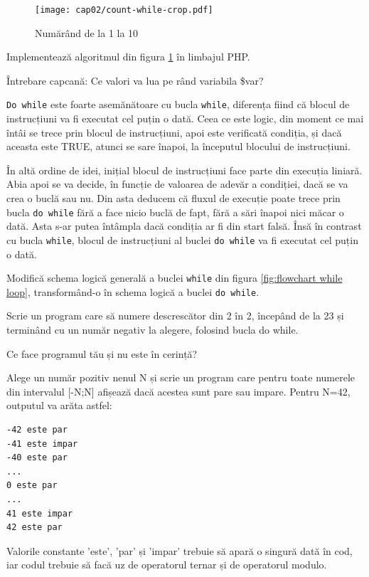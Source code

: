 \begin{figure}[ht!]
  \centering
    \texttt{[image: cap02/count-while-crop.pdf]}
  \caption{Numărând de la 1 la 10}
  \label{fig:while counting}
\end{figure}

\begin{Exercise}[title={Numărătoarea din 1 în 1 cu while},difficulty=1]
\ExePart
Implementează algoritmul din figura \ref{fig:while counting} în limbajul PHP.

\ExePart
Întrebare capcană: Ce valori va lua pe rând variabila \$var?
\end{Exercise}

\texttt{Do while} este foarte asemănătoare cu bucla \texttt{while},
diferența fiind că blocul de instrucțiuni va fi executat cel
puțin o dată. Ceea ce este logic, din moment ce mai întâi se
trece prin blocul de instrucțiuni, apoi este verificată condiția, și
dacă aceasta este TRUE, atunci se sare înapoi, la începutul blocului de
instrucțiuni.

În altă ordine de idei, inițial blocul de instrucțiuni
face parte din execuția liniară. Abia apoi se va decide, în funcție de valoarea
de adevăr a condiției, dacă se va crea o buclă sau nu. Din asta deducem
că fluxul de execuție poate trece prin {\glqq}bucla{\grqq} \texttt{do while} fără
a face nicio buclă de fapt, fără a sări înapoi nici măcar o dată. Asta s-ar putea
întâmpla dacă condiția ar fi din start falsă. Însă în contrast cu bucla
\texttt{while}, blocul de instrucțiuni al buclei \texttt{do while} va fi executat cel
puțin o dată.

\begin{Exercise}[title={Schema logică a buclei do while},difficulty=1]
Modifică schema logică generală a buclei \texttt{while} din
figura \ref{fig:flowchart while loop}, transformând-o în
schema logică a buclei \texttt{do while}.
\end{Exercise}


\begin{Exercise}[title={Numărătoarea din doi în doi cu do while},difficulty=1]
\ExePart
Scrie un program care să numere descrescător din 2 în 2, începând de la 23
și terminând cu un număr negativ la alegere, folosind bucla do while.

\ExePart
Ce face programul tău și nu este în cerință?
\end{Exercise}

\begin{Exercise}[title={Par sau impar?},difficulty=2]
Alege un număr pozitiv nenul N și scrie un program care
pentru toate numerele din intervalul [-N;N] afișează dacă acestea sunt pare
sau impare. Pentru N=42, outputul va arăta astfel:
\begin{verbatim}
-42 este par
-41 este impar
-40 este par
...
0 este par
...
41 este impar
42 este par
\end{verbatim}
Valorile constante 'este', 'par' și 'impar' trebuie să apară o singură dată în
cod, iar codul trebuie să facă uz de operatorul ternar și de operatorul modulo.
\end{Exercise}

